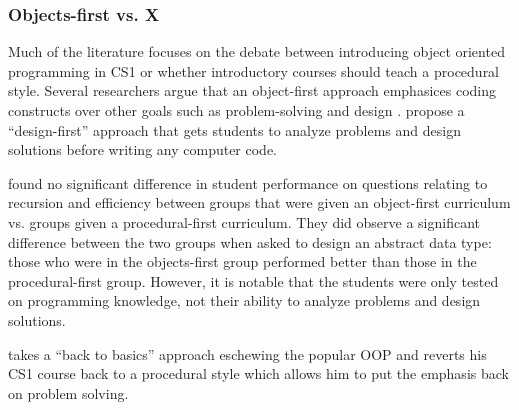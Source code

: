 \documentclass[12pt]{article}
\let\textcite=\autocite
\begin{document}
\subsubsection{Objects-first vs. X}
Much of the literature focuses on the debate between introducing
object oriented programming in CS1 or whether introductory courses
should teach a procedural style. Several researchers argue that an
object-first approach emphasices coding constructs over other goals
such as problem-solving and design
\autocite{moritz_objectsfirst_2005,muller_guidelines_2005,reges_back_2006}. \textcite{moritz_objectsfirst_2005}
propose a “design-first” approach that gets students to analyze
problems and design solutions before writing any computer code.

\autocite{vilner_fundamental_2007} found no significant difference in
student performance on questions relating to recursion and efficiency
between groups that were given an object-first curriculum vs. groups
given a procedural-first curriculum. They did observe a significant
difference between the two groups when asked to design an abstract
data type: those who were in the objects-first group performed better
than those in the procedural-first group. However, it is notable that
the students were only tested on programming knowledge, not their
ability to analyze problems and design solutions.

\textcite{reges_back_2006} takes a ``back to basics'' approach eschewing
the popular OOP and reverts his CS1 course back to a procedural style
which allows him to put the emphasis back on problem solving.

\vspace{4\baselineskip}\vspace{-\parskip} %

\printbibliography
\end{document}
